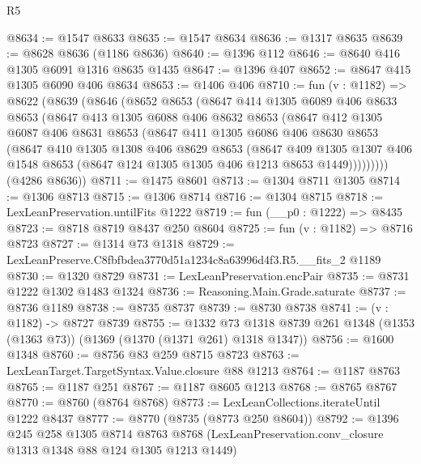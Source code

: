 \begin{lexlean}{R5}
\begin{coremodule}
@8634 := @1547 @8633
@8635 := @1547 @8634
@8636 := @1317 @8635
@8639 := @8628 @8636 (@1186 @8636)
@8640 := @1396 @112
@8646 := @8640 @416 @1305 @6091 @1316 @8635 @1435
@8647 := @1396 @407
@8652 := @8647 @415 @1305 @6090 @406 @8634
@8653 := @1406 @406
@8710 := fun (v : @1182) =>
  @8622
    (@8639
      (@8646
        (@8652
          @8653
          (@8647
            @414
            @1305
            @6089
            @406
            @8633
            @8653
            (@8647
              @413
              @1305
              @6088
              @406
              @8632
              @8653
              (@8647
                @412
                @1305
                @6087
                @406
                @8631
                @8653
                (@8647
                  @411
                  @1305
                  @6086
                  @406
                  @8630
                  @8653
                  (@8647
                    @410
                    @1305
                    @1308
                    @406
                    @8629
                    @8653
                    (@8647
                      @409
                      @1305
                      @1307
                      @406
                      @1548
                      @8653
                      (@8647 @124 @1305 @1305 @406 @1213 @8653 @1449)))))))))
      (@4286 @8636))
@8711 := @1475 @8601
@8713 := @1304 @8711 @1305
@8714 := @1306 @8713
@8715 := @1306 @8714
@8716 := @1304 @8715
@8718 := LexLeanPreservation.untilFits @1222
@8719 := fun (__p0 : @1222) => @8435
@8723 := @8718 @8719 @8437 @250 @8604
@8725 := fun (v : @1182) => @8716 @8723
@8727 := @1314 @73 @1318
@8729 := LexLeanPreserve.C8fbfbdea3770d51a1234c8a63996d4f3.R5.__fits_2 @1189
@8730 := @1320 @8729
@8731 := LexLeanPreservation.encPair
@8735 := @8731 @1222 @1302 @1483 @1324
@8736 := Reasoning.Main.Grade.saturate
@8737 := @8736 @1189
@8738 := @8735 @8737
@8739 := @8730 @8738
@8741 := (v : @1182) -> @8727 @8739
@8755 := @1332
    @73
    @1318
    @8739
    @261
    @1348
    (@1353 (@1363 @73))
    (@1369 (@1370 (@1371 @261) @1318 @1347))
@8756 := @1600 @1348
@8760 := @8756 @83 @259 @8715 @8723
@8763 := LexLeanTarget.TargetSyntax.Value.closure @88 @1213
@8764 := @1187 @8763
@8765 := @1187 @251
@8767 := @1187 @8605 @1213
@8768 := @8765 @8767
@8770 := @8760 (@8764 @8768)
@8773 := LexLeanCollections.iterateUntil @1222 @8437
@8777 := @8770 (@8735 (@8773 @250 @8604))
@8792 := @1396
    @245
    @258
    @1305
    @8714
    @8763
    @8768
    (LexLeanPreservation.conv_closure @1313 @1348 @88 @124 @1305 @1213 @1449)

\end{coremodule}
\end{lexlean}
